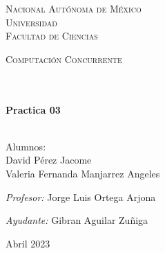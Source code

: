 \documentclass[14pt]{book}
\begin{document}
\begin{center}
\begin{minipage}{0.48\textwidth}
\begin{flushright}
    \end{flushright}
  \end{minipage}
  \vspace*{-1.5cm}
  \textsc{\huge Nacional Autónoma de México \\ \vspace{-4px} Universidad }\\[2cm]
  \textsc{\LARGE Facultad de Ciencias}\\[1.5cm]
  \begin{minipage}{0.9\textwidth}
    \begin{center}
      \textsc{\LARGE Computación Concurrente}
    \end{center}
  \end{minipage}\\[0.5cm]
  \vspace*{1cm}
  \HRule \\[0.4cm]
  { \huge \bfseries Practica 03}\\[0.4cm]
  \HRule \\[1.5cm]
  \begin{minipage}{0.52\textwidth}
    \begin{flushleft} \large \small \vspace{-0.6cm} \vspace{-0.6cm}
      Alumnos:\\
      
      David Pérez Jacome \\ Valeria Fernanda Manjarrez Angeles 
    \end{flushleft}
  \end{minipage}
  \begin{minipage}{0.46\textwidth}
    \vspace{-0.6cm}
    \begin{flushright} \large \small \emph{Profesor:}
      Jorge Luis Ortega Arjona \\
    \end{flushright}
    \begin{flushright} \large \small \emph{Ayudante:}
      Gibran Aguilar Zuñiga \\
    \end{flushright}
  \end{minipage}
  \vspace*{1cm}
  \vspace{2cm}
  \begin{center}
    {\large Abril 2023}
  \end{center}
\end{center}
\end{document}
